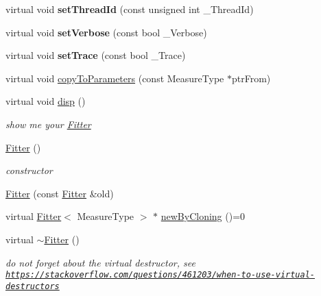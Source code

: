 \begin{DoxyCompactItemize}
\item 
\hypertarget{class_ox_1_1_fitter_aa1fc4674aa6a3e6c8567c86ec1fa90e0}{virtual void {\bfseries set\-Thread\-Id} (const unsigned int \-\_\-\-Thread\-Id)}\label{class_ox_1_1_fitter_aa1fc4674aa6a3e6c8567c86ec1fa90e0}

\item 
\hypertarget{class_ox_1_1_fitter_a696da03b83fe3083f29ae4c0e2ecfc44}{virtual void {\bfseries set\-Verbose} (const bool \-\_\-\-Verbose)}\label{class_ox_1_1_fitter_a696da03b83fe3083f29ae4c0e2ecfc44}

\item 
\hypertarget{class_ox_1_1_fitter_a4ac0096f6bc6d733c542d28a839d32c9}{virtual void {\bfseries set\-Trace} (const bool \-\_\-\-Trace)}\label{class_ox_1_1_fitter_a4ac0096f6bc6d733c542d28a839d32c9}

\item 
virtual void \hyperlink{class_ox_1_1_fitter_a783ba791c88d7208deb4004354b10022}{copy\-To\-Parameters} (const Measure\-Type $\ast$ptr\-From)
\item 
\hypertarget{class_ox_1_1_fitter_a0a9b45eb21ba174327f95a894e6331b6}{virtual void \hyperlink{class_ox_1_1_fitter_a0a9b45eb21ba174327f95a894e6331b6}{disp} ()}\label{class_ox_1_1_fitter_a0a9b45eb21ba174327f95a894e6331b6}

\begin{DoxyCompactList}\small\item\em show me your \hyperlink{class_ox_1_1_fitter}{Fitter} \end{DoxyCompactList}\item 
\hypertarget{class_ox_1_1_fitter_a7b42acb389394bc4c496990eea8b9ac9}{\hyperlink{class_ox_1_1_fitter_a7b42acb389394bc4c496990eea8b9ac9}{Fitter} ()}\label{class_ox_1_1_fitter_a7b42acb389394bc4c496990eea8b9ac9}

\begin{DoxyCompactList}\small\item\em constructor \end{DoxyCompactList}\item 
\hyperlink{class_ox_1_1_fitter_ac51130b722159f88a0dad59877b76417}{Fitter} (const \hyperlink{class_ox_1_1_fitter}{Fitter} \&old)
\item 
virtual \hyperlink{class_ox_1_1_fitter}{Fitter}$<$ Measure\-Type $>$ $\ast$ \hyperlink{class_ox_1_1_fitter_a665ec51e52ed351c9ef801acc83fbdea}{new\-By\-Cloning} ()=0
\item 
\hypertarget{class_ox_1_1_fitter_ab56eef37096f6f0687d83b8d15e00d43}{virtual \hyperlink{class_ox_1_1_fitter_ab56eef37096f6f0687d83b8d15e00d43}{$\sim$\-Fitter} ()}\label{class_ox_1_1_fitter_ab56eef37096f6f0687d83b8d15e00d43}

\begin{DoxyCompactList}\small\item\em do not forget about the virtual destructor, see \href{https://stackoverflow.com/questions/461203/when-to-use-virtual-destructors}{\tt https\-://stackoverflow.\-com/questions/461203/when-\/to-\/use-\/virtual-\/destructors} \end{DoxyCompactList}\end{DoxyCompactItemize}
